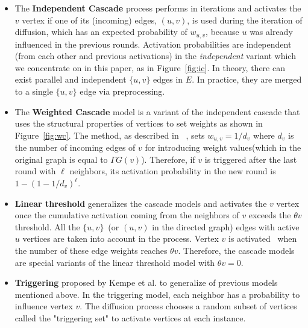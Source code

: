 \documentclass[10pt,journal,compsoc]{IEEEtran}
\begin{document}
\begin{itemize}[leftmargin=*]
\item The {\bf Independent Cascade} process performs in iterations and activates the $v$ vertex if one of its (incoming) edges, $(u, v)$, is 
used during the iteration of diffusion, which has an expected probability of $w_{u, v}$, because $u$ was already influenced in the previous rounds. 
Activation probabilities are independent (from each other and previous activations) in the {\em independent} variant which we concentrate on in this paper, as in Figure~\ref{fig:ic}.
In theory, there can exist parallel and  independent $\{u, v\}$ edges in $E$. In practice, they are merged to a single $\{u,v\}$ edge via preprocessing. 

\item The {\bf Weighted Cascade}  model is a variant of the independent cascade that uses the structural properties of vertices to set weights as shown in Figure~\ref{fig:wc}.
The method, as described in ~\cite{MixGreedy}, sets $w_{u, v} = 1 / d_v$ where $d_v$ is the number 
of incoming edges of $v$ for introducing weight values(which in the original graph is equal to $\Gamma G(v)$).
Therefore, if $v$ is triggered after the last round with $\ell$ neighbors, its activation probability in the new round is $1-( 1-1 / d_v)^\ell$. 


\item{\bf Linear threshold} generalizes the cascade models and activates the $v$ vertex once the cumulative activation coming from the neighbors of $v$ exceeds the $\theta v$ threshold. 
All the $\{u, v\}$~(or $(u, v)$ in the directed graph) edges 
with active $u$ vertices are taken into account in the process. Vertex $v$ is activated~\cite{kempe2003maximizing} when the number of these edge weights reaches $\theta v$.  
Therefore, the cascade models are special variants of the linear threshold model with $\theta v = 0 $. 


\item {\bf Triggering} proposed by Kempe et al.\cite{kempe2003maximizing} to generalize of previous models mentioned above. In the triggering model, each neighbor has a probability to influence vertex $v$. The diffusion process chooses a random subset of vertices called the "triggering set" to activate vertices at each instance.
\end{itemize}
\end{document}
